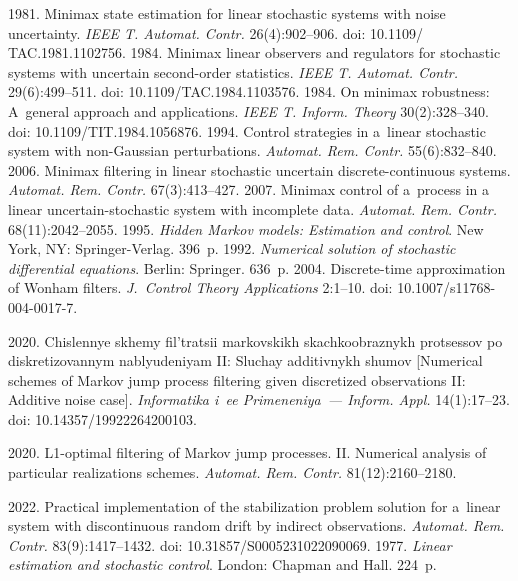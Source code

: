 \begin{multicols}{2}
{{\begin{thebibliography}{99}
       1981. Minimax state estimation for linear stochastic systems with 
noise uncertainty. \textit{IEEE T. Automat. Contr.} 26(4):902--906. doi: 10.1109/ TAC.1981.1102756.
       1984. Minimax linear observers and regulators for stochastic 
systems with uncertain second-order statistics. \textit{IEEE T. Automat. Contr.} 29(6):499--511. doi: 
10.1109/TAC.1984.1103576.
       1984. On minimax robustness: A~general approach and 
applications. \textit{IEEE T. Inform. Theory} 30(2):328--340. doi: 10.1109/TIT.1984.1056876.
       1994. Control strategies in a~linear stochastic system with non-Gaussian 
perturbations. \textit{Automat. Rem. Contr.} 55(6):832--840. 
       2006. Minimax filtering in linear stochastic uncertain 
discrete-continuous systems. \textit{Automat. Rem. Contr.} 67(3):413--427.
       2007. Minimax control of a~process in a linear 
uncertain-stochastic system with incomplete data. \textit{Automat. Rem. Contr.} 68(11):2042--2055.
       1995. \textit{Hidden Markov models: 
Estimation and control}. New York, NY: Springer-Verlag. 396~p.
       1992. \textit{Numerical solution of stochastic differential 
equations}. Berlin: Springer. 636~p.
       2004. Discrete-time approximation of Wonham filters. 
\textit{J.~Control Theory Applications}  2:1--10. doi: 10.1007/s11768-004-0017-7.

       2020. Chis\-len\-nye skhe\-my fil't\-ra\-tsii mar\-kov\-skikh skach\-ko\-ob\-raz\-nykh 
pro\-tses\-sov po dis\-kre\-ti\-zo\-van\-nym nab\-lyu\-de\-niyam II: Slu\-chay ad\-di\-tiv\-nykh shu\-mov [Numerical schemes of 
Markov jump process filtering given discretized observations II: Additive noise case]. \textit{Informatika 
i~ee Primeneniya~--- Inform. Appl.} 14(1):17--23. doi: 10.14357/19922264200103.

       2020. L1-optimal filtering of Markov jump processes. II. Numerical 
analysis of particular realizations schemes. \textit{Automat. Rem. Contr.} 81(12):2160--2180.

       2022. Practical implementation of the stabilization 
problem solution for a~linear system with discontinuous random drift by indirect observations. 
\textit{Automat. Rem. Contr.} 83(9):1417--1432. doi: 10.31857/S0005231022090069.
       1977. \textit{Linear estimation and stochastic control}. London: 
Chapman and Hall. 224~p.


\end{thebibliography}}}
\end{multicols}
